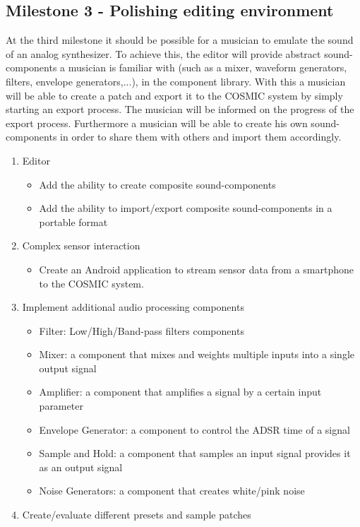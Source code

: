 \subsection{Milestone 3 - Polishing editing environment}

At the third milestone it should be possible for a musician to emulate the sound of an analog synthesizer. 
To achieve this, the editor will provide abstract sound-components a musician is familiar with (such as a mixer, waveform generators, filters, envelope generators,...), in the component library. 
With this a musician will be able to create a patch and export it to the \ac{COSMIC} system by simply starting an export process. 
The musician will be informed on the progress of the export process. 
Furthermore a musician will be able to create his own sound-components in order to share them with others and import them accordingly.

	\begin{enumerate}
		\item Editor
			\begin{itemize}
				\item Add the ability to create composite sound-components
				\item Add the ability to import/export composite sound-components in a portable format
			\end{itemize}
		\item Complex sensor interaction
			\begin{itemize}
				\item Create an Android application to stream sensor data from a smartphone to the \ac{COSMIC} system.
			\end{itemize}
		\item Implement additional audio processing components	
			\begin{itemize}
				\item Filter: Low/High/Band-pass filters components
				\item Mixer: a component that mixes and weights multiple inputs into a single output signal
				\item Amplifier: a component that amplifies a signal by a certain input parameter
				\item Envelope Generator: a component to control the \ac{ADSR} time of a signal
				\item Sample and Hold: a component that samples an input signal provides it as an output signal
				\item Noise Generators: a component that creates white/pink noise
			\end{itemize}
		\item Create/evaluate different presets and sample patches
	\end{enumerate}
	
